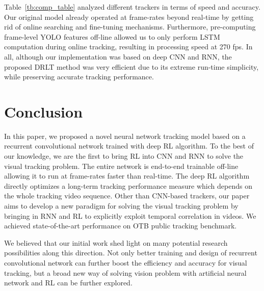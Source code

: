 \documentclass[10pt,twocolumn,letterpaper]{article}
\begin{document}
Table~\ref{tb:comp_table} analyzed different trackers in terms of speed and accuracy. Our original model already operated at frame-rates beyond real-time by getting rid of online searching and fine-tuning mechanisms. Furthermore, pre-computing frame-level YOLO features off-line allowed us to only perform LSTM computation during online tracking, resulting in processing speed at 270 fps. In all, although our implementation was based on deep CNN and RNN, the proposed DRLT method was very efficient due to its extreme run-time simplicity, while preserving accurate tracking performance.

\section{Conclusion}
\label{sec:conclusion}

In this paper, we proposed a novel neural network tracking model based on a recurrent convolutional network trained with deep RL algorithm. To the best of our knowledge, we are the first to bring RL into CNN and RNN to solve the visual tracking problem. The entire network is end-to-end trainable off-line allowing it to run at frame-rates faster than real-time. The deep RL algorithm directly optimizes a long-term tracking performance measure which depends on the whole tracking video sequence. Other than CNN-based trackers, our paper aims to develop a new paradigm for solving the visual tracking problem by bringing in RNN and RL to explicitly exploit temporal correlation in videos. We achieved state-of-the-art performance on OTB public tracking benchmark.


We believed that our initial work shed light on many potential research possibilities along this direction. Not only better training and design of recurrent convolutional network can further boost the efficiency and accuracy for visual tracking, but a broad new way of solving vision problem with artificial neural network and RL can be further explored.  


{\small


}
\end{document}
